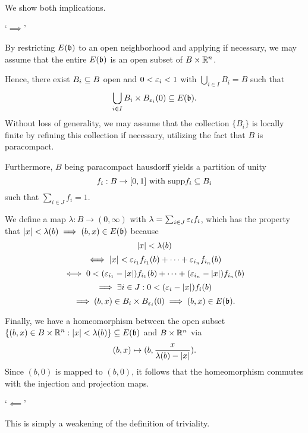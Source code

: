 \begin{myproof}
    We show both implications.

    `$\implies$'

    By restricting $E(\bb)$ to an open neighborhood
    and applying  if necessary,
    we may assume that the entire $E(\bb)$ is an open subset of $B \times \mathbb{R}^n$.

    Hence,
    there exist $B_i \subseteq{} B$ open and $0 < \varepsilon{}_i < 1$ with $\bigcup_{i \in I} B_i = B$ such that
    \[ \bigcup_{i \in I } B_i \cross \ball[\eps_i] \sub E(\bb). \]
    Without loss of generality,
    we may assume that the collection $\{B_i\}$ is locally finite by refining this collection if necessary,
    utilizing the fact that $B$ is paracompact.

    Furthermore, $B$ being paracompact hausdorff yields a partition of unity
    \[ f_i: B \to [0, 1] \text{ with } \text{supp}{f_i} \subseteq{} B_i\]
    such that $\sum_{i \in J}f_i = 1$.
    
    We define a map $\lambda: B \to (0, \infty)$ with $\lambda = \sum_{i \in J} \varepsilon{}_i f_i$,
    which has the property that $\abs{x} < \lambda(b) \implies (b, x) \in E(\bb)$ because
    \[ \vert{} x \vert{} < \lambda(b) \]
    \[ \iff  \vert{} x \vert{} < \varepsilon{}_{i_1} f_{i_1}(b) + \cdots + \varepsilon{}_{i_n} f_{i_n}(b) \]
    \[ \iff 0 < (\varepsilon{}_{i_1} - \vert{} x \vert{}) f_{i_1}(b) + \cdots + (\varepsilon{}_{i_n} - \vert{} x \vert{}) f_{i_n}(b) \]
    \[ \implies \exists i \in J: 0 < (\varepsilon{}_{i} - \vert{} x \vert{}) f_{i}(b) \]
    \[ \implies (b, x) \in B_i \cross \ball[\eps_i]  \implies (b, x) \in E(\bb). \]

    Finally, we have a homeomorphism between the open subset
    $\set{(b, x) \in B \cross \R^n}{\abs{x} < \lambda(b)} \sub E(\bb)$ and $B \times \mathbb{R}^n$ via
    \[ (b, x) \mapsto (b, \frac{x}{\lambda(b) - \vert{} x \vert{}}). \]
    Since $(b, 0)$ is mapped to $(b, 0)$, it follows that
    the homeomorphism commutes with the injection and projection maps.

    `$\impliedby$'

    This is simply a weakening of the definition of triviality.
\end{myproof}